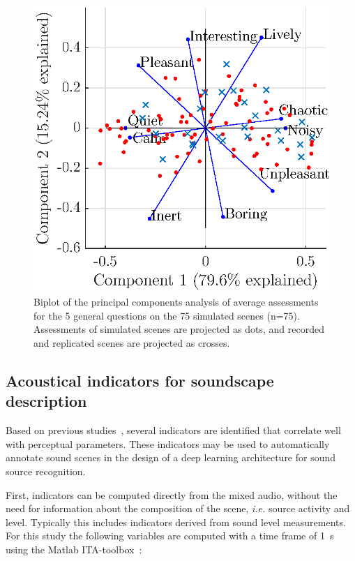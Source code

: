 \documentclass[twocolumn]{article}
\begin{document}
\begin{figure}[h]
    \centering
    \includegraphics[width=0.8\columnwidth]{figures/pca_sim.eps}
    \caption{Biplot of the principal components analysis of average assessments for the 5 general questions on the 75 simulated scenes (n=75). Assessments of simulated scenes are projected as dots, and recorded and replicated scenes are projected as crosses.}\label{fig:pspace_sim}
\end{figure}


\subsection{Acoustical indicators for soundscape description}
\label{sec:data_inds}

Based on previous studies~\cite{aumond2017, gontier2018, ricciardi2014}, several indicators are identified that correlate well with perceptual parameters. These indicators may be used to automatically annotate sound scenes in the design of a deep learning architecture for sound source recognition.

First, indicators can be computed directly from the mixed audio, without the need for information about the composition of the scene, \textit{i.e.} source activity and level. Typically this includes indicators derived from sound level measurements. For this study the following variables are computed with a time frame of 1~s using the Matlab ITA-toolbox~\cite{itatoolbox2017}:
\end{document}
